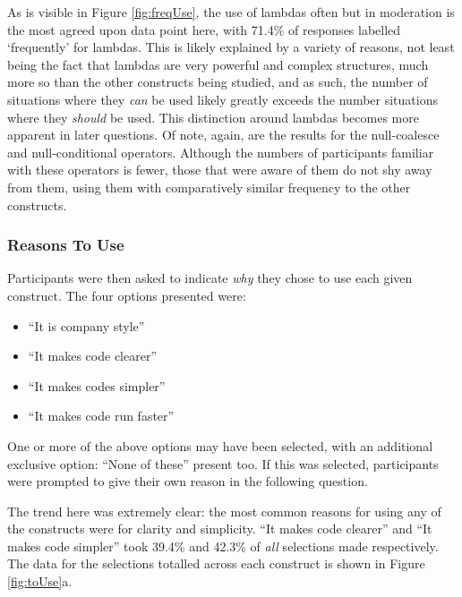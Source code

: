 \documentclass{article}
\begin{document}
            As is visible in Figure \ref{fig:freqUse}, the use of lambdas often but in moderation is the most agreed upon data point here, with 71.4\% of responses labelled `frequently' for lambdas. This is likely explained by a variety of reasons, not least being the fact that lambdas are very powerful and complex structures, much more so than the other constructs being studied, and as such, the number of situations where they \emph{can} be used likely greatly exceeds the number situations where they \emph{should} be used. This distinction around lambdas becomes more apparent in later questions.
            Of note, again, are the results for the null-coalesce and null-conditional operators. Although the numbers of participants familiar with these operators is fewer, those that were aware of them do not shy away from them, using them with comparatively similar frequency to the other constructs.

        \subsubsection{Reasons To Use}
        \label{subsubsec:toUse}
            Participants were then asked to indicate \emph{why} they chose to use each given construct. The four options presented were:
            \begin{itemize}
                \item ``It is company style''
                \item ``It makes code clearer''
                \item ``It makes codes simpler''
                \item ``It makes code run faster''
            \end{itemize}
            One or more of the above options may have been selected, with an additional exclusive option: ``None of these'' present too. If this was selected, participants were prompted to give their own reason in the following question.
            \newline

            The trend here was extremely clear: the most common reasons for using any of the constructs were for clarity and simplicity. ``It makes code clearer'' and ``It makes code simpler'' took 39.4\% and 42.3\% of \emph{all} selections made respectively. The data for the selections totalled across each construct is shown in Figure \ref{fig:toUse}a.
\end{document}
